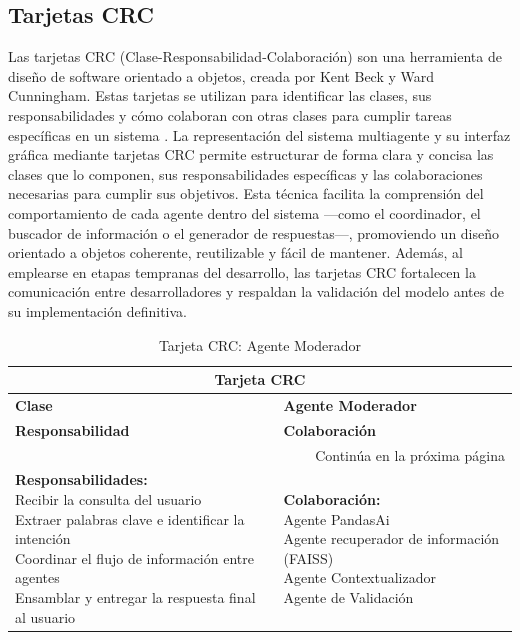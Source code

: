 \subsection{Tarjetas CRC}

Las tarjetas CRC (Clase-Responsabilidad-Colaboración) son una herramienta de diseño de software orientado a objetos, creada por Kent Beck y Ward Cunningham. Estas tarjetas se utilizan para identificar las clases, sus responsabilidades y cómo colaboran con otras clases para cumplir tareas específicas en un sistema \cite{BeckCunningham}. La representación del sistema multiagente y su interfaz gráfica mediante tarjetas CRC permite estructurar de forma clara y concisa las clases que lo componen, sus responsabilidades específicas y las colaboraciones necesarias para cumplir sus objetivos. Esta técnica facilita la comprensión del comportamiento de cada agente dentro del sistema —como el coordinador, el buscador de información o el generador de respuestas—, promoviendo un diseño orientado a objetos coherente, reutilizable y fácil de mantener. Además, al emplearse en etapas tempranas del desarrollo, las tarjetas CRC fortalecen la comunicación entre desarrolladores y respaldan la validación del modelo antes de su implementación definitiva.

\begin{longtable}{|l|l|}
	\caption{Tarjeta CRC: Agente Moderador} \label{tablacrc1} \\
	
	\hline
	\multicolumn{2}{|c|}{\textbf{Tarjeta CRC}} \\
	\hline
	\textbf{Clase} & \textbf{Agente Moderador} \\
	\hline
	\endfirsthead
	
	\hline
	\textbf{Responsabilidad} & \textbf{Colaboración} \\
	\hline
	\endhead
	
	\hline
	\multicolumn{2}{|r|}{Continúa en la próxima página} \\
	\hline
	\endfoot
	
	\hline
	\endlastfoot
	
	\parbox[t]{0.45\linewidth}{\textbf{Responsabilidades:} \\ 
		Recibir la consulta del usuario \\ 
		Extraer palabras clave e identificar la intención \\ 
		Coordinar el flujo de información entre agentes \\ 
		Ensamblar y entregar la respuesta final al usuario} 
	& 
	\parbox[t]{0.45\linewidth}{\textbf{Colaboración:} \\
		Agente PandasAi \\ 
		Agente recuperador de información (FAISS)\\
		Agente Contextualizador \\ 
		Agente de Validación}
\end{longtable}


